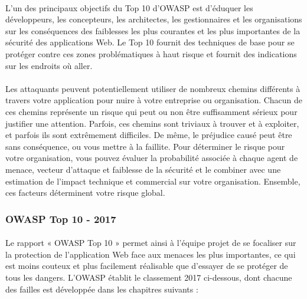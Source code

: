    \paragraph{}
    L'un des principaux objectifs du Top 10 d'OWASP est d'éduquer les développeurs, les concepteurs, les architectes, les gestionnaires et les organisations sur les conséquences des faiblesses les plus courantes et les plus importantes de la sécurité des applications Web. Le Top 10 fournit des techniques de base pour se protéger contre ces zones problématiques à haut risque et fournit des indications sur les endroits où aller.
    \paragraph{}
    Les attaquants peuvent potentiellement utiliser de nombreux chemins différents à travers votre application pour nuire à votre entreprise ou organisation. Chacun de ces chemins représente un risque qui peut ou non être suffisamment sérieux pour justifier une attention. Parfois, ces chemins sont triviaux à trouver et à exploiter, et parfois ils sont extrêmement difficiles. De même, le préjudice causé peut être sans conséquence, ou vous mettre à la faillite. Pour déterminer le risque pour votre organisation, vous pouvez évaluer la probabilité associée à chaque agent de menace, vecteur d'attaque et faiblesse de la sécurité et le combiner avec une estimation de l'impact technique et commercial sur votre organisation. Ensemble, ces facteurs déterminent votre risque global.
    
    \subsubsection{OWASP Top 10 - 2017}
      \paragraph{}
      Le rapport « OWASP Top 10 » permet ainsi à l’équipe projet de se focaliser sur la protection de l’application Web
      face aux menaces les plus importantes, ce qui est moins couteux et plus facilement réalisable
      que d’essayer de se protéger de tous les dangers. L’OWASP établit le classement 2017
      ci-dessous, dont chacune des failles est développée dans les chapitres suivants :
            
